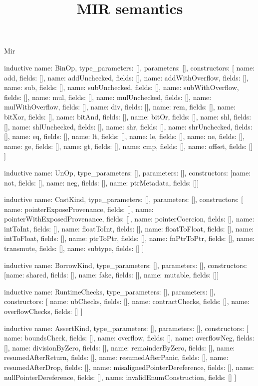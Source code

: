 \begin{lexlean}{Mir}
\title{MIR semantics}
\begin{semanticmodule}
inductive{
  name: BinOp,
  type_parameters: [],
  parameters: [],
  constructors: [
    {name: add, fields: []},
    {name: addUnchecked, fields: []},
    {name: addWithOverflow, fields: []},
    {name: sub, fields: []},
    {name: subUnchecked, fields: []},
    {name: subWithOverflow, fields: []},
    {name: mul, fields: []},
    {name: mulUnchecked, fields: []},
    {name: mulWithOverflow, fields: []},
    {name: div, fields: []},
    {name: rem, fields: []},
    {name: bitXor, fields: []},
    {name: bitAnd, fields: []},
    {name: bitOr, fields: []},
    {name: shl, fields: []},
    {name: shlUnchecked, fields: []},
    {name: shr, fields: []},
    {name: shrUnchecked, fields: []},
    {name: eq, fields: []},
    {name: lt, fields: []},
    {name: le, fields: []},
    {name: ne, fields: []},
    {name: ge, fields: []},
    {name: gt, fields: []},
    {name: cmp, fields: []},
    {name: offset, fields: []}
  ]
}

inductive{
  name: UnOp,
  type_parameters: [],
  parameters: [],
  constructors: [{name: not, fields: []}, {name: neg, fields: []}, {name: ptrMetadata, fields: []}]
}

inductive{
  name: CastKind,
  type_parameters: [],
  parameters: [],
  constructors: [
    {name: pointerExposeProvenance, fields: []},
    {name: pointerWithExposedProvenance, fields: []},
    {name: pointerCoercion, fields: []},
    {name: intToInt, fields: []},
    {name: floatToInt, fields: []},
    {name: floatToFloat, fields: []},
    {name: intToFloat, fields: []},
    {name: ptrToPtr, fields: []},
    {name: fnPtrToPtr, fields: []},
    {name: transmute, fields: []},
    {name: subtype, fields: []}
  ]
}

inductive{
  name: BorrowKind,
  type_parameters: [],
  parameters: [],
  constructors: [{name: shared, fields: []}, {name: fake, fields: []}, {name: mutable, fields: []}]
}

inductive{
  name: RuntimeChecks,
  type_parameters: [],
  parameters: [],
  constructors: [
    {name: ubChecks, fields: []},
    {name: contractChecks, fields: []},
    {name: overflowChecks, fields: []}
  ]
}

inductive{
  name: AssertKind,
  type_parameters: [],
  parameters: [],
  constructors: [
    {name: boundsCheck, fields: []},
    {name: overflow, fields: []},
    {name: overflowNeg, fields: []},
    {name: divisionByZero, fields: []},
    {name: remainderByZero, fields: []},
    {name: resumedAfterReturn, fields: []},
    {name: resumedAfterPanic, fields: []},
    {name: resumedAfterDrop, fields: []},
    {name: misalignedPointerDereference, fields: []},
    {name: nullPointerDereference, fields: []},
    {name: invalidEnumConstruction, fields: []}
  ]
}


\end{semanticmodule}
\end{lexlean}
